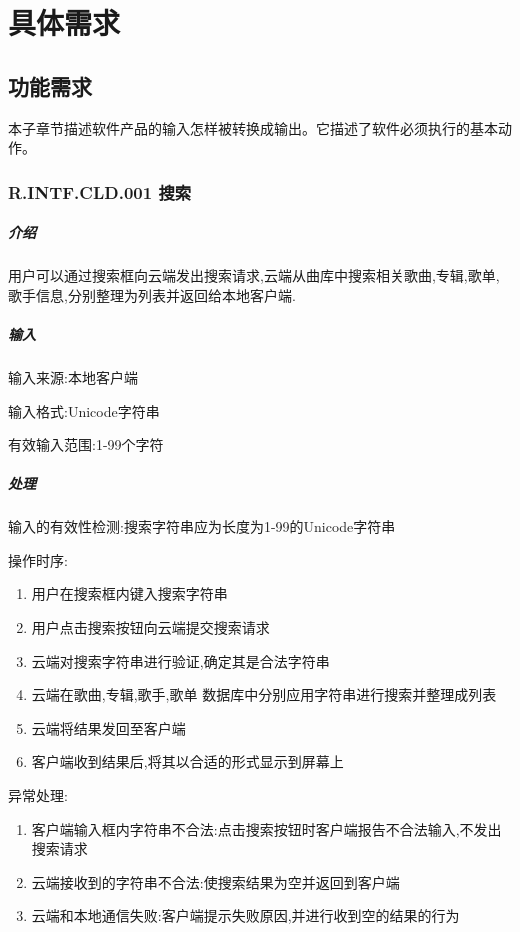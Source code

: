 \chapter{具体需求}
\section{功能需求}

本子章节描述软件产品的输入怎样被转换成输出。它描述了软件必须执行的基本动作。 



\subsection{R.INTF.CLD.001 搜索}
\paragraph{介绍}
用户可以通过搜索框向云端发出搜索请求,云端从曲库中搜索相关歌曲,专辑,歌单,歌手信息,分别整理为列表并返回给本地客户端.

\paragraph{输入}
输入来源:本地客户端

输入格式:Unicode字符串

有效输入范围:1-99个字符

\paragraph{处理}

输入的有效性检测:搜索字符串应为长度为1-99的Unicode字符串


操作时序:
\begin{enumerate}
	\item 用户在搜索框内键入搜索字符串
	\item 用户点击搜索按钮向云端提交搜索请求
	\item 云端对搜索字符串进行验证,确定其是合法字符串
	\item 云端在歌曲,专辑,歌手,歌单 数据库中分别应用字符串进行搜索并整理成列表
	\item 云端将结果发回至客户端
	\item 客户端收到结果后,将其以合适的形式显示到屏幕上
\end{enumerate}

异常处理:
\begin{enumerate}
	\item 客户端输入框内字符串不合法:点击搜索按钮时客户端报告不合法输入,不发出搜索请求
	\item 云端接收到的字符串不合法:使搜索结果为空并返回到客户端
	\item 云端和本地通信失败:客户端提示失败原因,并进行收到空的结果的行为
\end{enumerate}


